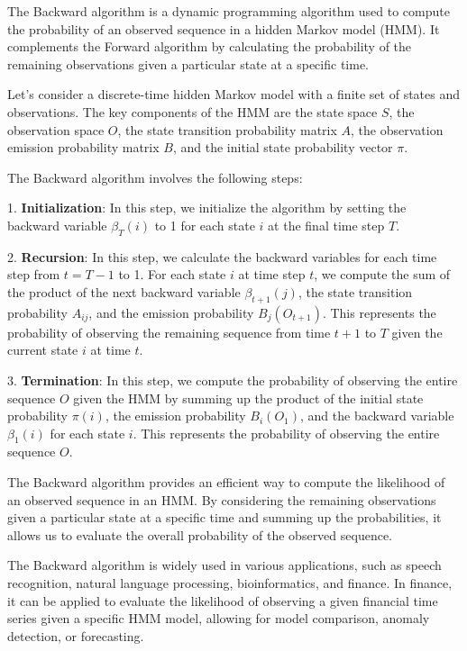 \documentclass[a4paper,11pt]{article}
\begin{document}
The Backward algorithm is a dynamic programming algorithm used to compute the probability of an observed sequence in a hidden Markov model (HMM). It complements the Forward algorithm by calculating the probability of the remaining observations given a particular state at a specific time.

Let's consider a discrete-time hidden Markov model with a finite set of states and observations. The key components of the HMM are the state space $S$, the observation space $O$, the state transition probability matrix $A$, the observation emission probability matrix $B$, and the initial state probability vector $\pi$.

The Backward algorithm involves the following steps:

1. \textbf{Initialization}: In this step, we initialize the algorithm by setting the backward variable $\beta_T(i)$ to 1 for each state $i$ at the final time step $T$.

2. \textbf{Recursion}: In this step, we calculate the backward variables for each time step from $t = T-1$ to 1. For each state $i$ at time step $t$, we compute the sum of the product of the next backward variable $\beta_{t+1}(j)$, the state transition probability $A_{ij}$, and the emission probability $B_{j}(O_{t+1})$. This represents the probability of observing the remaining sequence from time $t+1$ to $T$ given the current state $i$ at time $t$.

3. \textbf{Termination}: In this step, we compute the probability of observing the entire sequence $O$ given the HMM by summing up the product of the initial state probability $\pi(i)$, the emission probability $B_{i}(O_1)$, and the backward variable $\beta_1(i)$ for each state $i$. This represents the probability of observing the entire sequence $O$.

The Backward algorithm provides an efficient way to compute the likelihood of an observed sequence in an HMM. By considering the remaining observations given a particular state at a specific time and summing up the probabilities, it allows us to evaluate the overall probability of the observed sequence.

The Backward algorithm is widely used in various applications, such as speech recognition, natural language processing, bioinformatics, and finance. In finance, it can be applied to evaluate the likelihood of observing a given financial time series given a specific HMM model, allowing for model comparison, anomaly detection, or forecasting.
\end{document}
